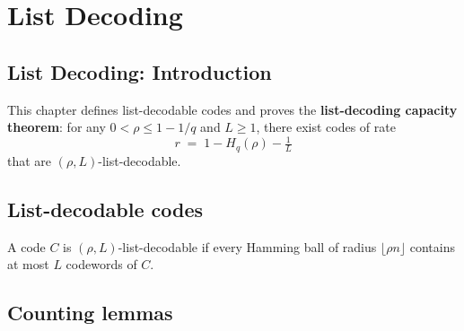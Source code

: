 \section{List Decoding}
\subsection*{List Decoding: Introduction}

This chapter defines list-decodable codes and proves the
\textbf{list-decoding capacity theorem}: for any $0<\rho\le 1-1/q$ and $L\ge 1$,
there exist codes of rate
\[
r \;=\; 1 - H_q(\rho) - \tfrac{1}{L}
\]
that are $(\rho,L)$-list-decodable.

\subsection{List-decodable codes}

\begin{definition}
\label{ErrorCorrectingCodes.Codeword.list_decodable}
\leanok
{}
A code $C$ is $(\rho,L)$-list-decodable if every Hamming ball of radius
$\lfloor\rho n\rfloor$ contains at most $L$ codewords of $C$.
\end{definition}

\subsection{Counting lemmas}

